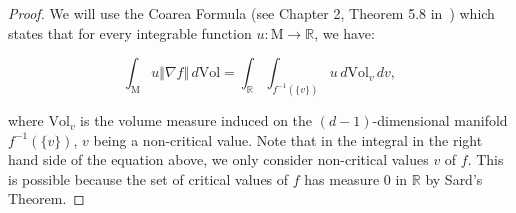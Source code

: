 \documentclass[pdflatex,sn-mathphys-ay]{sn-jnl}%
\newcommand{\man}{\mathrm{M}}
\newcommand{\vol}{\mathrm{Vol}}
\newcommand{\R}{\mathbb{R}}
\newcommand{\preim}[2]{#1^{-1}(#2)}
\theoremstyle{thmstyleone}%
\begin{document}
\begin{proof}
We will use the Coarea Formula (see Chapter 2, Theorem 5.8 in~\citet{sakai1996riemannian}) which states that for every integrable function $u\colon\man\rightarrow\R$, we have:

$$\int_\man u\Vert\nabla f\Vert\,d\vol=\int_{\R}\int_{\preim{f}{\{v\}}}u\,d\vol_v\,dv,$$

where $\vol_v$ is the volume measure induced on the $(d-1)$-dimensional manifold $\preim{f}{\{v\}}$, $v$ being a non-critical value. Note that in the integral in the right hand side of the equation above, we only consider non-critical values $v$ of $f$. This is possible because the set of critical values of $f$ has measure 0 in $\R$ by Sard's Theorem.


\end{proof}
\end{document}
